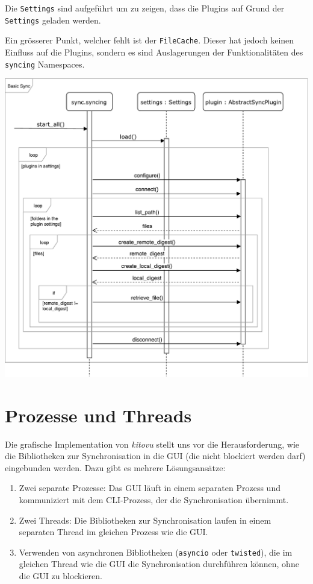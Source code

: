 \documentclass[a4paper]{article}
\let\oldsection\section
\renewcommand\section{\clearpage\oldsection}
\begin{document}
Die \verb|Settings| sind aufgeführt um zu zeigen, dass die Plugins auf Grund der \verb|Settings| geladen werden.

Ein grösserer Punkt, welcher fehlt ist der \verb|FileCache|.
Dieser hat jedoch keinen Einfluss auf die Plugins, sondern es sind Auslagerungen der Funktionalitäten des \verb|syncing| Namespaces.

\includegraphics[width=40em]{./img/GrobesSequenzDiagramm.pdf}

\section{Prozesse und Threads}


Die grafische Implementation von \emph{kitovu} stellt uns vor die Herausforderung, wie die Bibliotheken zur Synchronisation in die GUI (die nicht blockiert werden darf) eingebunden werden. Dazu gibt es mehrere Lösungsansätze:

\begin{enumerate}
	\item Zwei separate Prozesse: Das GUI läuft in einem separaten Prozess und kommuniziert mit dem CLI-Prozess, der die Synchronisation übernimmt.
	\item Zwei Threads: Die Bibliotheken zur Synchronisation laufen in einem separaten Thread im gleichen Prozess wie die GUI.
	\item Verwenden von asynchronen Bibliotheken (\verb|asyncio| oder \verb|twisted|), die im gleichen Thread wie die GUI die Synchronisation durchführen können, ohne die GUI zu blockieren.
\end{enumerate}
\end{document}
